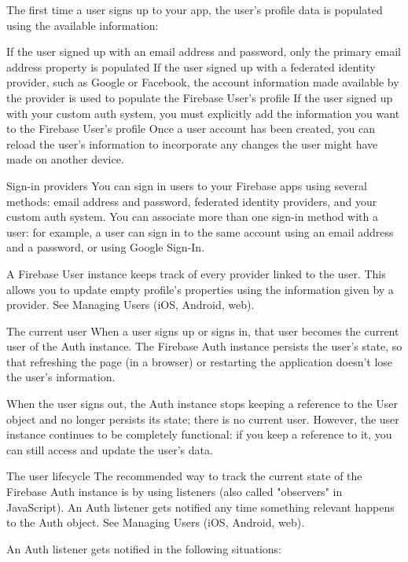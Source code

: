 The first time a user signs up to your app, the user's profile data is populated using the available information:

If the user signed up with an email address and password, only the primary email address property is populated
If the user signed up with a federated identity provider, such as Google or Facebook, the account information made available by the provider is used to populate the Firebase User's profile
If the user signed up with your custom auth system, you must explicitly add the information you want to the Firebase User's profile
Once a user account has been created, you can reload the user's information to incorporate any changes the user might have made on another device.

Sign-in providers
You can sign in users to your Firebase apps using several methods: email address and password, federated identity providers, and your custom auth system. You can associate more than one sign-in method with a user: for example, a user can sign in to the same account using an email address and a password, or using Google Sign-In.

A Firebase User instance keeps track of every provider linked to the user. This allows you to update empty profile's properties using the information given by a provider. See Managing Users (iOS, Android, web).

The current user
When a user signs up or signs in, that user becomes the current user of the Auth instance. The Firebase Auth instance persists the user's state, so that refreshing the page (in a browser) or restarting the application doesn't lose the user's information.

When the user signs out, the Auth instance stops keeping a reference to the User object and no longer persists its state; there is no current user. However, the user instance continues to be completely functional: if you keep a reference to it, you can still access and update the user's data.

The user lifecycle
The recommended way to track the current state of the Firebase Auth instance is by using listeners (also called "observers" in JavaScript). An Auth listener gets notified any time something relevant happens to the Auth object. See Managing Users (iOS, Android, web).

An Auth listener gets notified in the following situations:

